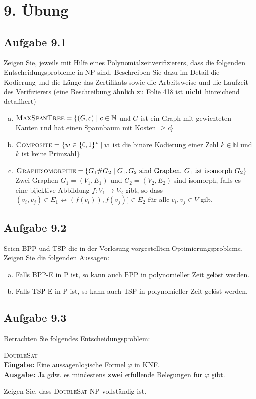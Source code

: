 \section*{9. Übung}
\subsection*{Aufgabe 9.1}
Zeigen Sie, jeweils mit Hilfe eines Polynomialzeitverifizierers, dass die folgenden Entscheidungsprobleme in NP sind. Beschreiben Sie dazu im Detail die Kodierung und die Länge das Zertifikats sowie die Arbeitsweise und die Laufzeit des Verifizierers (eine Beschreibung ähnlich zu Folie 418 ist \textbf{nicht} hinreichend detailliert)
\begin{enumerate}[(a)]
	\item $\textsc{MaxSpanTree} = \{ (G,c) \mid c \in \mathbb{N} $ und $G $ ist ein Graph mit gewichteten Kanten und hat einen Spannbaum mit Kosten $ \geq c \}$
	\item $\textsc{Composite} = \{ w \in \{0,1\}^* \mid w $ ist die binäre Kodierung einer Zahl $k \in \mathbb{N} $ und $k$ ist keine Primzahl$ \}$
	\item $\textsc{Graphisomorphie} = \{ G_1 \# G_2 \mid G_1, G_2 \text{ sind Graphen, }G_1 \text{ ist isomorph }G_2 \}$\\
	Zwei Graphen $G_1 = (V_1, E_1)$ und $G_2 = (V_2, E_2)$ sind isomorph, falls es eine bijektive Abbildung $f: V_1 \rightarrow V_2$ gibt, so dass $(v_i, v_j) \in E_1 \Leftrightarrow (f(v_i)), f(v_j)) \in E_2$ für alle $v_i, v_j \in V$ gilt.
\end{enumerate}
\subsection*{Aufgabe 9.2}
Seien BPP und TSP die in der Vorlesung vorgestellten Optimierungsprobleme. Zeigen Sie die folgenden Aussagen:
\begin{enumerate}[(a)]
	\item Falls BPP-E in P ist, so kann auch BPP in polynomieller Zeit gelöst werden.
	\item Falls TSP-E in P ist, so kann auch TSP in polynomieller Zeit gelöst werden.
\end{enumerate}
\subsection*{Aufgabe 9.3}
Betrachten Sie folgendes Entscheidungsproblem:
\begin{framed}
	\textsc{DoubleSat}\\
	\textbf{Eingabe:} Eine aussagenlogische Formel $\varphi$ in KNF.\\
	\textbf{Ausgabe:} Ja gdw. es mindestens \textbf{zwei} erfüllende Belegungen für $\varphi$ gibt.
\end{framed}
Zeigen Sie, dass \textsc{DoubleSat} NP-vollständig ist.